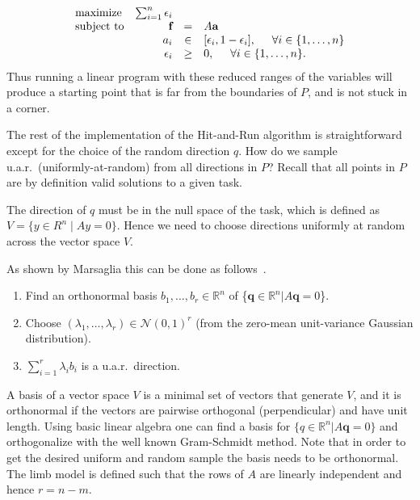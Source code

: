 \documentclass[letterpaper]{article}
\begin{document}
\begin{equation}\label{eq:LP_r}
\begin{array}{lrcl}
\mbox{maximize} & \sum_{i=1}^n \epsilon_i \\
\mbox{subject to} & \textbf{f} &=& A\textbf{a}\\
 & a_i &\in& [\epsilon_i, 1- \epsilon_i], \hspace{5mm} \forall i \in \{1,\dots,n\} \\
 & \epsilon_i &\geq& 0, \hspace{5mm} \forall i \in \{1,\dots,n\}.
\end{array}
\end{equation}
Thus running a linear program with these reduced ranges of the variables will produce a starting point that is far from the boundaries of $P$, and is not stuck in a corner.



The rest of the implementation of the Hit-and-Run algorithm is straightforward except for the choice of the random direction $q$. How do we sample u.a.r.\ (uniformly-at-random) from all directions in $P$?
Recall that all points in $P$ are by definition valid solutions to a given task.

The direction of $q$ must be in the null space of the task, which is defined as $V = \{ y \in R^n \mid Ay = 0\}$. Hence we need to choose  directions uniformly at random across the vector space $V$.

As shown by Marsaglia this can be done as follows~\cite{Marsaglia}.
\begin{enumerate}
\item
Find an orthonormal basis $b_1, \dots, b_r \in \mathbb{R}^{n}$ of \{$\textbf{q} \in \mathbb{R}^n | A\textbf{q} = 0$\}.
\item
Choose $(\lambda_1, \dots, \lambda_r) \in \mathcal{N}(0,1)^r$ (from the zero-mean unit-variance Gaussian distribution).
\item
$\sum_{i=1}^r \lambda_i b_i$ is a u.a.r.\ direction.
\end{enumerate}

A basis of a vector space $V$ is a minimal set of vectors that generate $V$, and it is orthonormal if the vectors are pairwise orthogonal (perpendicular) and have unit length. Using basic linear algebra one can find a basis for $\{q \in \mathbb{R}^n | A\textbf{q} = 0\}$ and orthogonalize with the well known Gram-Schmidt method. Note that in order to get the desired uniform and random sample the basis needs to be orthonormal. The limb model is defined such that the rows of $A$ are linearly independent and hence $r=n-m$.
\end{document}
